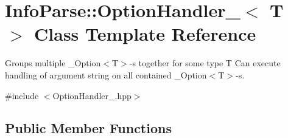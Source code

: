 \hypertarget{class_info_parse_1_1_option_handler__}{}\section{Info\+Parse\+::Option\+Handler\+\_\+$<$ T $>$ Class Template Reference}
\label{class_info_parse_1_1_option_handler__}


Groups multiple \+\_\+\+Option$<$\+T$>$-\/s together for some type T Can execute handling of argument string on all contained \+\_\+\+Option$<$\+T$>$-\/s.




{\ttfamily \#include $<$Option\+Handler\+\_\+.\+hpp$>$}

\subsection*{Public Member Functions}

